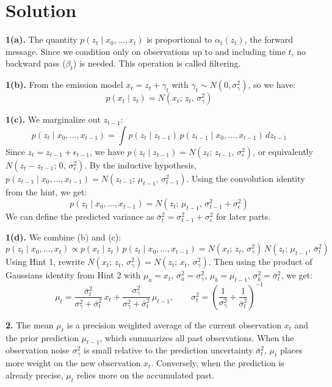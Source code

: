 \documentclass[submit]{../harvardml}
\newcommand{\sigeps}{\sigma_{\epsilon}}
\newcommand{\siggam}{\sigma_{\gamma}}
\newenvironment{solution}
  {\color{blue}\section*{Solution}}
{}
\begin{document}
\begin{solution}

\textbf{1(a).} The quantity $p(z_t \mid x_0, \ldots, x_t)$ is proportional to $\alpha_t(z_t)$, the forward message. Since we condition only on observations up to and including time $t$, no backward pass ($\beta_t$) is needed. This operation is called filtering.

\textbf{1(b).} From the emission model $x_t = z_t + \gamma_t$ with $\gamma_t \sim N(0, \siggam^2)$, so we have:
\[
p(x_t \mid z_t) = N(x_t;\, z_t,\, \siggam^2)
\]

\textbf{1(c).} We marginalize out $z_{t-1}$:
\[
p(z_t \mid x_0, \ldots, x_{t-1}) = \int p(z_t \mid z_{t-1})\, p(z_{t-1} \mid x_0, \ldots, x_{t-1})\, dz_{t-1}
\]
Since $z_t = z_{t-1} + \epsilon_{t-1}$, we have $p(z_t \mid z_{t-1}) = N(z_t;\, z_{t-1},\, \sigeps^2)$, or equivalently $N(z_t - z_{t-1};\, 0,\, \sigeps^2)$. By the inductive hypothesis, $p(z_{t-1} \mid x_0, \ldots, x_{t-1}) = N(z_{t-1};\, \mu_{t-1},\, \sigma_{t-1}^2)$. Using the convolution identity from the hint, we get:
\[
p(z_t \mid x_0, \ldots, x_{t-1}) = N(z_t;\, \mu_{t-1},\, \sigma_{t-1}^2 + \sigeps^2)
\]
We can define the predicted variance as $\bar{\sigma}_t^2 = \sigma_{t-1}^2 + \sigeps^2$ for later parts.

\textbf{1(d).} We combine (b) and (c):
\[
p(z_t \mid x_0, \ldots, x_t) \propto p(x_t \mid z_t)\, p(z_t \mid x_0, \ldots, x_{t-1}) = N(x_t;\, z_t,\, \siggam^2)\, N(z_t;\, \mu_{t-1},\, \bar{\sigma}_t^2)
\]
Using Hint 1, rewrite $N(x_t;\, z_t,\, \siggam^2) = N(z_t;\, x_t,\, \siggam^2)$. Then using the product of Gaussians identity from Hint 2 with $\mu_a = x_t$, $\sigma_a^2 = \siggam^2$, $\mu_b = \mu_{t-1}$, $\sigma_b^2 = \bar{\sigma}_t^2$, we get:
\[
\mu_t = \frac{\bar{\sigma}_t^2}{\siggam^2 + \bar{\sigma}_t^2}\, x_t + \frac{\siggam^2}{\siggam^2 + \bar{\sigma}_t^2}\, \mu_{t-1}, \qquad \sigma_t^2 = \left(\frac{1}{\siggam^2} + \frac{1}{\bar{\sigma}_t^2}\right)^{-1}
\]

\textbf{2.} The mean $\mu_t$ is a precision weighted average of the current observation $x_t$ and the prior prediction $\mu_{t-1}$, which summarizes all past observations. When the observation noise $\siggam^2$ is small relative to the prediction uncertainty $\bar{\sigma}_t^2$, $\mu_t$ places more weight on the new observation $x_t$. Conversely, when the prediction is already precise, $\mu_t$ relies more on the accumulated past.

\end{solution}
\end{document}
